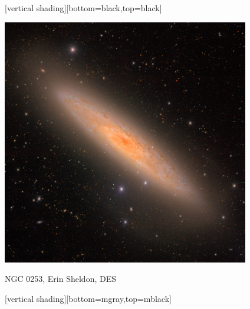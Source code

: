 \documentclass{beamer}
\begin{document}
{
    [vertical shading][bottom=black,top=black]
	
    \frame
    {

        \begin{center}
            \includegraphics[width=0.81\textwidth]{ngc0253-small.jpg}

            {\tiny \hfill NGC 0253, Erin Sheldon, DES}
        \end{center}
    }

    [vertical shading][bottom=mgray,top=mblack]

}
\end{document}
